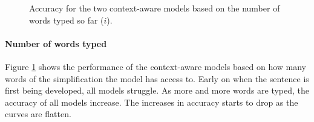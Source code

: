 \documentclass[11pt]{article}
\begin{document}


\begin{figure}[t]
\caption{Accuracy for the two context-aware models based on the number of words typed so far ($i$).}
\label{fig:position_based}
\end{figure}

\paragraph{Number of words typed}
Figure \ref{fig:position_based} shows the performance of the context-aware models based on how many words of the simplification the model has access to. Early on when the sentence is first being developed, all models struggle. As more and more words are typed, the accuracy of all models increase. The increases in accuracy starts to drop as the curves are flatten.
\end{document}
